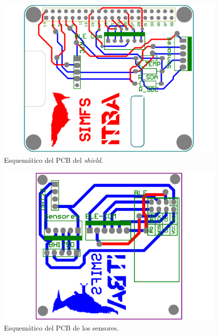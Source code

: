 \begin{figure}[H]
	\centering
	\includegraphics[width=0.75\linewidth, page=1]{ImagenesApendice/PCBShield}
	\caption{Esquemático del PCB del \textit{shield}.}
	\label{fig:shield}
\end{figure}

\begin{figure}[H]
	\centering
	\includegraphics[width=0.75\linewidth, page=1]{ImagenesApendice/PCBSensores}
	\caption{Esquemático del PCB de los sensores.}
	\label{fig:sensores}
\end{figure}